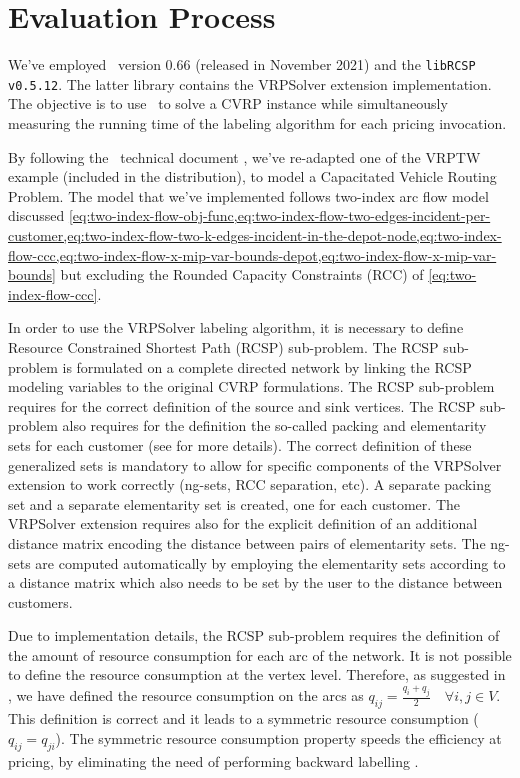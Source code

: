 \section{Evaluation Process}
\label{sec:results-evaluation-process}

We've employed \bapcod\ version 0.66 (released in November 2021) and the \texttt{libRCSP v0.5.12}.
The latter library contains the VRPSolver extension implementation.
The objective is to use \bapcod\ to solve a CVRP instance while simultaneously
measuring the running time of the labeling algorithm for each pricing invocation.

\medskip

By following the \bapcod\ technical document \parencite{sadykov2021},
we've re-adapted one of the VRPTW example (included in the distribution),
to model a Capacitated Vehicle Routing Problem.
The model that we've implemented follows two-index arc flow model
discussed \cref{eq:two-index-flow-obj-func,eq:two-index-flow-two-edges-incident-per-customer,eq:two-index-flow-two-k-edges-incident-in-the-depot-node,eq:two-index-flow-ccc,eq:two-index-flow-x-mip-var-bounds-depot,eq:two-index-flow-x-mip-var-bounds}
but excluding the Rounded Capacity Constraints (RCC) of \cref{eq:two-index-flow-ccc}.

In order to use the VRPSolver labeling algorithm, it is necessary
to define Resource Constrained Shortest Path (RCSP) sub-problem.
The RCSP sub-problem is formulated on a complete directed network by
linking the RCSP modeling variables to the original CVRP formulations.
The RCSP sub-problem requires for the correct definition of the source and sink
vertices.
The RCSP sub-problem also requires for the definition the so-called packing and elementarity
sets for each customer (see \cite{pessoa2020a} for more details).
The correct definition of these generalized sets is mandatory to allow for specific
components of the VRPSolver extension to work correctly (ng-sets, RCC separation, etc).
A separate packing set and a separate elementarity set is created, one for each customer.
The VRPSolver extension requires also for the explicit definition of an additional
distance matrix encoding the distance between pairs of elementarity sets.
The ng-sets are computed automatically by employing the elementarity sets
according to a distance matrix which also needs to be set by the user
to the distance between customers.

Due to implementation details, the RCSP sub-problem requires
the definition of the amount of resource consumption for each arc of the network.
It is not possible to define the resource consumption at the vertex level.
Therefore, as suggested in \textcite{pessoa2020a}, we have defined the resource consumption
on the arcs as $q_{ij} = \frac{q_{i} + q_{j}}{2} \quad \forall i, j \in V$.
This definition is correct and it leads to a symmetric resource consumption ($q_{ij} = q_{ji}$).
The symmetric resource consumption property speeds the efficiency at pricing,
by eliminating the need of performing backward labelling \parencite{pessoa2020a}.

